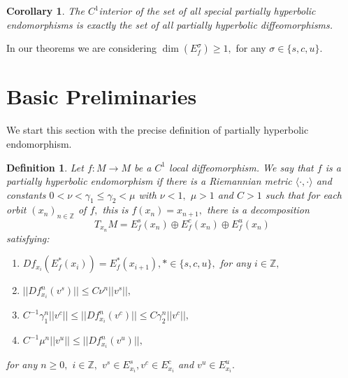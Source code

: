 \documentclass[12pt,reqno]{amsart}
\numberwithin{equation}{section}
\theoremstyle{plain}
\newcommand{\Z}{\mathbb{Z}}
\newtheorem{corollary}[theorem]{Corollary}
\newtheorem{definition}[theorem]{Definition}
\theoremstyle{remark}
\begin{document}
\begin{corollary}\label{Teo E}
 The $C^1$interior of the set of all special partially hyperbolic endomorphisms is exactly the set of all partially hyperbolic diffeomorphisms.
\end{corollary}

In our theorems we are considering $\dim(E^{\sigma}_f) \geq 1,$ for any $\sigma \in \{s,c,u\}.$



















\section{Basic Preliminaries}

We start this section with the precise definition of partially hyperbolic endomorphism.

\begin{definition}\label{def 1}
Let $f:M\rightarrow M$ be a $C^1$ local diffeomorphism. We say that $f$ is a \emph{partially hyperbolic endomorphism} if there is a Riemannian metric
$\langle\cdot,\cdot\rangle$ and
constants \mbox{$0<\nu<\gamma_1\leq\gamma_2<\mu$} with $\nu<1,$ $\mu>1$ and $C>1$ such
that for each orbit $(x_n)_{n\in{\Z}}$ of $f,$ this is $f(x_n)=x_{n+1},$ there is a decomposition
$$T_{x_n}M=E^s_f({x_n})\oplus E^c_f(x_n)\oplus E^u_f(x_n)$$ satisfying:

\begin{enumerate}

\item $Df_{x_i}(E^{\ast}_f(x_i))=E^{\ast}_f(x_{i+1}), \ast \in \{s,c,u\},$  for any $i \in \mathbb{Z},$
\item $||Df^n_{x_i}(v^s)||\leq C\nu^n||v^s||,$
 \item  $C^{-1}\gamma^n_1||v^c||\leq||Df^n_{x_i}(v^c)||\leq C\gamma^n_2||v^c||,$
 \item $C^{-1}\mu^n||v^u||\leq||Df^n_{x_i}(v^u)||,$


\end{enumerate}
for any $n \geq 0,$  $i \in \mathbb{Z},$  $ v^s\in E_{x_i}^s,  v^c\in E_{x_i}^c$ and  $v^u\in E_{x_i}^u.$
\end{definition}
\end{document}
